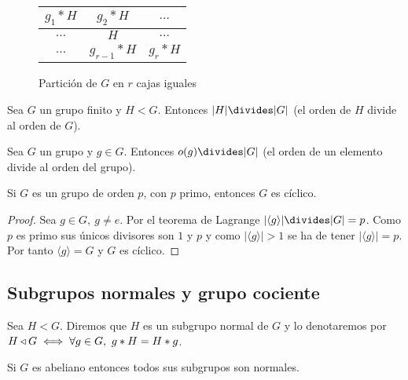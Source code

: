 \begin{figure}[h]
	\centering
	\renewcommand{\arraystretch}{1.5}
	\begin{tabular}{|c|c|c|}
		\hline
		$g_1 \ast H$ & $g_2 \ast H$ & $\dots$ \\\hline
		$\dots$ & $H$ & $\dots$ \\\hline
		$\dots$ & $g_{r-1} \ast H$ & $g_r \ast H$\\\hline
	\end{tabular}
	\caption{Partición de $G$ en $r$ cajas iguales}
	\label{table:cajasiguales}
\end{figure}



\begin{thm}[de Lagrange]
	\label{thm:lagrange}
	Sea $G$ un grupo finito y $H < G$. Entonces $|H| \divides |G| $ (el orden de $H$ divide al orden de $G$).
\end{thm}

\begin{cor}
	Sea $G$ un grupo y $g \in G$. Entonces $o(g) \divides |G|$ (el orden de un elemento divide al orden del grupo).
\end{cor}

\begin{cor}
	Si $G$ es un grupo de orden $p$, con $p$ primo, entonces $G$ es cíclico.
\end{cor}

\begin{proof}
	Sea $g \in G,\ g \neq e$. Por el teorema de Lagrange $|\langle g \rangle| \divides |G| = p$. Como $p$ es primo sus únicos divisores son $1$ y $p$ y como $|\langle g \rangle| > 1$ se ha de tener $|\langle g \rangle| = p$. Por tanto $\langle g \rangle = G$ y $G$ es cíclico. 
\end{proof}

\subsection{Subgrupos normales y grupo cociente}


\begin{dfn}
	Sea $H < G$. Diremos que $H$ es un subgrupo normal de $G$ y lo denotaremos por $H \mathbin{\triangleleft} G \iff \forall g \in G,\ g\ast H = H \ast g$.  
\end{dfn}

\begin{pro}
	Si $G$ es abeliano entonces todos sus subgrupos son normales.
\end{pro}


